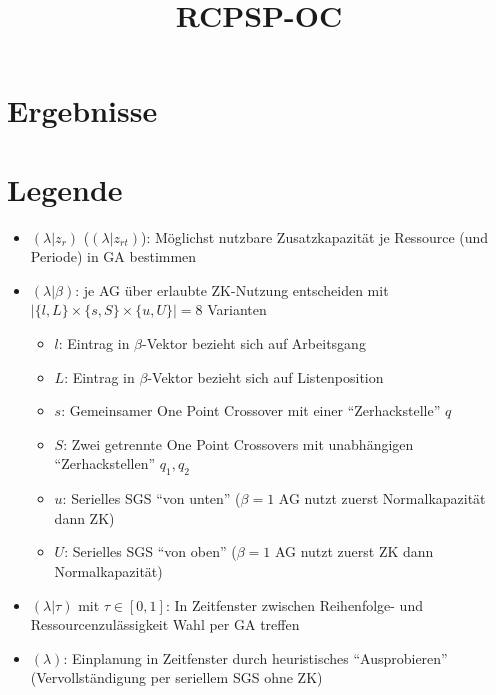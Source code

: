\documentclass{scrartcl}
\title{RCPSP-OC}
\date{}
\begin{document}
\setlength\extrarowheight{5pt}
\section{Ergebnisse}
\section{Legende}
\begin{itemize}
\item $(\lambda|z_r)$ ($(\lambda|z_{rt})$): Möglichst nutzbare Zusatzkapazität je Ressource (und Periode) in GA bestimmen
\item $(\lambda|\beta)$: je AG über erlaubte ZK-Nutzung entscheiden mit $|\{l,L\} \times \{s, S\} \times \{u, U\}|=8$ Varianten
	\begin{itemize}
	\item $l$: Eintrag in $\beta$-Vektor bezieht sich auf Arbeitsgang
	\item $L$: Eintrag in $\beta$-Vektor bezieht sich auf Listenposition
	\item $s$: Gemeinsamer One Point Crossover mit einer ``Zerhackstelle'' $q$
	\item $S$: Zwei getrennte One Point Crossovers mit unabhängigen ``Zerhackstellen'' $q_1, q_2$
	\item $u$: Serielles SGS ``von unten'' ($\beta=1$ AG nutzt zuerst Normalkapazität dann ZK)
	\item $U$: Serielles SGS ``von oben'' ($\beta=1$ AG nutzt zuerst ZK dann Normalkapazität)
	\end{itemize}
\item $(\lambda|\tau)$ mit $\tau \in [0,1]$: In Zeitfenster zwischen Reihenfolge- und Ressourcenzulässigkeit Wahl per GA treffen
\item $(\lambda)$: Einplanung in Zeitfenster durch heuristisches ``Ausprobieren'' (Vervollständigung per seriellem SGS ohne ZK)
\end{itemize}
\end{document}
